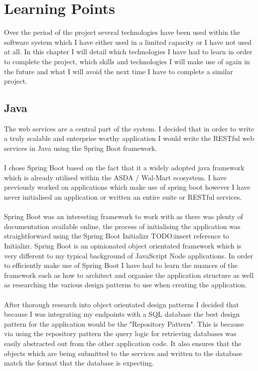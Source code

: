 \documentclass[a4paper,11pt]{report}
\begin{document}
\chapter{Learning Points}
Over the period of the project several technologies have been used within the software system
which I have either used in a limited capacity or I have not used at all. In this chapter I will
detail which technologies I have had to learn in order to complete the project, which skills and 
technologies I will make use of again in the future and what I will avoid the next time I have to 
complete a similar project.

\section{Java}
The web services are a central part of the system. I decided that in order to write a truly scalable
and enterprise worthy application I would write the RESTful web services in Java using the Spring Boot framework.
\\
\\
I chose Spring Boot based on the fact that it a widely adopted java framework which is already utilised
within the ASDA / Wal-Mart ecosystem. I have previously worked on applications which make use of spring
boot however I have never initialised an application or written an entire suite or RESTful services.
\\
\\
Spring Boot was an interesting framework to work with as there was plenty of documentation available online,
the process of initialising the application was straightforward using the Spring Boot Initializr TODO:insert reference to Initializr. 
Spring Boot is an opinionated object orientated framework which is very different to my typical background 
of JavaScript Node applications. In order to efficiently make use of Spring Boot I have had to learn the nuances
of the framework such as how to architect and organise the application structure as well as 
researching the various design patterns to use when creating the application. 
\\
\\
After thorough research into object orientated design patterns I decided that because I was integrating my endpoints
with a SQL database the best design pattern for the application would be the "Repository Pattern". This is because 
via using the repository pattern the query logic for retrieving databases was easily abstracted out from the other 
application code. It also ensures that the objects which are being submitted to the services and written to the database
match the format that the database is expecting.
\\
\\
\end{document}

